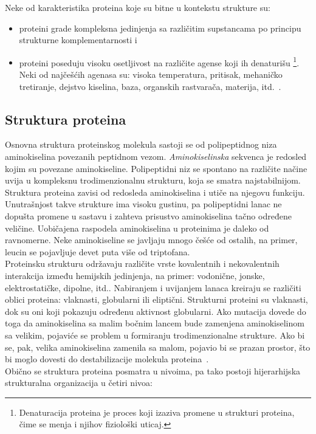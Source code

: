 Neke od karakteristika proteina koje su bitne u kontekstu strukture su:
\begin{itemize}
\item proteini grade kompleksna jedinjenja sa različitim supstancama po principu strukturne komplementarnosti i  
\item proteini poseduju visoku osetljivost na različite agense koji ih denaturišu \footnote{Denaturacija proteina je proces koji izaziva promene u strukturi proteina, čime se menja i njihov fiziološki uticaj.}. Neki od najčešćih agenasa su: visoka temperatura, pritisak, mehaničko tretiranje, dejstvo kiselina, baza, organskih rastvarača, materija, itd.~\cite{spasic,JKd}.
\end{itemize}
 
\subsection{Struktura proteina}
Osnovna struktura proteinskog molekula sastoji se od polipeptidnog niza aminokiselina povezanih peptidnom vezom. \textit{Aminokiselinska} sekvenca je redosled kojim su povezane aminokiseline. Polipeptidni niz se spontano na različite načine uvija  u kompleksnu trodimenzionalnu strukturu, koja se smatra najstabilnijom. Struktura proteina zavisi od redosleda aminokiselina i utiče na njegovu funkciju. Unutrašnjost takve strukture ima visoku gustinu, pa polipeptidni lanac ne dopušta promene u sastavu i zahteva prisustvo aminokiselina tačno određene veličine. Uobičajena raspodela aminokiselina u proteinima je daleko od ravnomerne. Neke aminokiseline se javljaju mnogo češće od ostalih, na primer, leucin se pojavljuje devet puta više od triptofana.
~\cite{Principi,biopathways,spasic} \\
Proteinsku strukturu održavaju različite vrste kovalentnih i nekovalentnih interakcija između hemijskih jedinjenja, na primer: vodonične, jonske, elektrostatičke, dipolne, itd.. Nabiranjem i uvijanjem lanaca kreiraju se različiti oblici proteina: vlaknasti, globularni ili eliptični. Strukturni proteini su vlaknasti, dok su oni koji pokazuju određenu aktivnost globularni. Ako mutacija dovede do toga da aminokiselina sa malim bočnim lancem bude zamenjena aminokiselinom sa velikim, pojaviće se problem u formiranju trodimenzionalne strukture. Ako bi se, pak, velika aminokiselina zamenila sa malom, pojavio bi se prazan prostor, što bi moglo dovesti do destabilizacije molekula proteina~\cite{Principi,spasic,biopathways,medbio}. \\
Obično se struktura proteina posmatra u nivoima, pa tako postoji hijerarhijska strukturalna organizacija u četiri nivoa:

